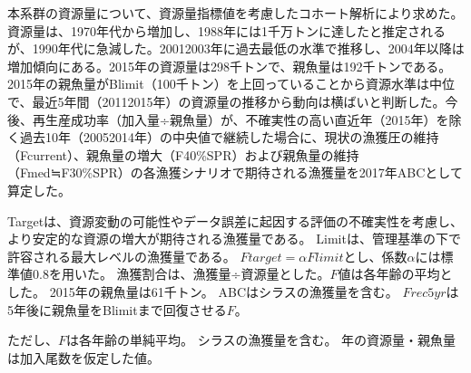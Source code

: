 本系群の資源量について、資源量指標値を考慮したコホート解析により求めた。資源量は、1970年代から増加し、1988年には1千万トンに達したと推定されるが、1990年代に急減した。20012003年に過去最低の水準で推移し、2004年以降は増加傾向にある。2015年の資源量は298千トンで、親魚量は192千トンである。2015年の親魚量がBlimit（100千トン）を上回っていることから資源水準は中位で、最近5年間（20112015年）の資源量の推移から動向は横ばいと判断した。今後、再生産成功率（加入量÷親魚量）が、不確実性の高い直近年（2015年）を除く過去10年（20052014年）の中央値で継続した場合に、現状の漁獲圧の維持（Fcurrent）、親魚量の増大（F40\%SPR）および親魚量の維持（Fmed≒F30\%SPR）の各漁獲シナリオで期待される漁獲量を2017年ABCとして算定した。


%

Targetは、資源変動の可能性やデータ誤差に起因する評価の不確実性を考慮し、
より安定的な資源の増大が期待される漁獲量である。
Limitは、管理基準の下で許容される最大レベルの漁獲量である。
$Ftarget = \alpha Flimit$とし、係数$\alpha$には標準値0.8を用いた。
漁獲割合は、漁獲量÷資源量とした。$F$値は各年齢の平均とした。
2015年の親魚量は61千トン。
ABCはシラスの漁獲量を含む。
$Frec5yr$は5年後に親魚量をBlimitまで回復させる$F$。


ただし、$F$は各年齢の単純平均。
シラスの漁獲量を含む。
\thisyrad 年の資源量・親魚量は加入尾数を仮定した値。%
